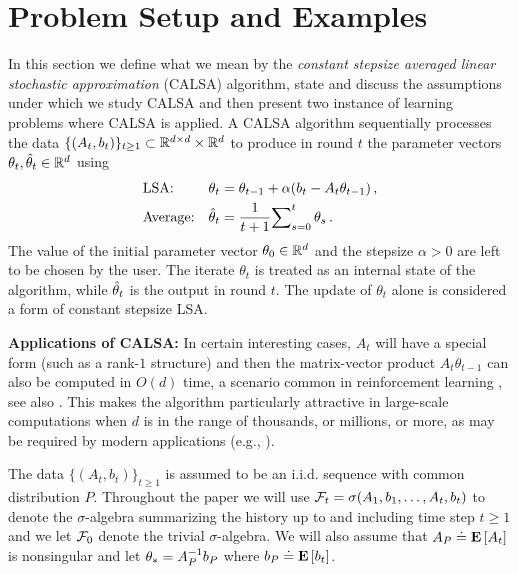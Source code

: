 \section{Problem Setup and Examples}\label{sec:prob}
In this section we define what we mean by the \emph{constant stepsize averaged linear stochastic approximation} (CALSA) algorithm, state and discuss the assumptions under which we study CALSA and then present two instance of learning problems where CALSA is applied. A CALSA algorithm sequentially processes the data $\{(A_t,b_t)\}_{t\ge 1} \subset \mathbb{R}^{d \times d} \times \mathbb{R}^d$ to produce in round $t$ the parameter vectors 
$\theta_t,\hat{\theta}_t\in \mathbb{R}^{d}$  using 
\begin{subequations}\label{eq:lsa}
\begin{align}
\label{conststep}&\text{LSA:} &\theta_t&=\theta_{t-1}+\alpha(b_t-A_t\theta_{t-1})\,,\\
\label{iteravg}&\text{Average:} &\hat{\theta}_t&=\frac{1}{t+1}{\sum}_{s=0}^{t}\,\theta_s\,.
\end{align}
\end{subequations}
The value of the initial parameter vector $\theta_0\in \mathbb{R}^d$ and the stepsize $\alpha>0$ are left to be chosen by the user. 
The iterate $\theta_t$ is treated as an internal state of the algorithm, while $\hat{\theta}_t$ is the output in round $t$. The update of $\theta_t$ alone is considered a form of constant stepsize LSA.

\textbf{Applications of CALSA:} In certain interesting cases, $A_t$ will have a special form (such as a rank-$1$ structure) and then the matrix-vector product $A_t \theta_{t-1}$ can also be computed in $O(d)$ time, a scenario common in reinforcement learning \cite{sutton,konda-tsitsiklis,gtd,gtd2,gtdmp}, see also . This makes the algorithm particularly attractive in large-scale computations when $d$ is in the range of thousands, or millions, or more, as may be required by modern applications (e.g., \citep{LiMaTaBo16}). 
\fi

The data $\{(A_t,b_t)\}_{t\ge 1}$ is assumed to be an i.i.d. sequence with common distribution $P$. 
Throughout the paper we will use
$\mathcal{F}_t = \sigma(A_1,b_1,\dots,A_t,b_t)$ to denote the $\sigma$-algebra summarizing the history up to and
including time step $t\ge 1$ and we let $\mathcal{F}_0$ denote the trivial $\sigma$-algebra. We will also assume
that $A_P \doteq \mathbf{E}\left[A_t\right]$ is nonsingular and let $\theta_* = A_P^{-1} b_P$ where $b_P \doteq \mathbf{E}\left[b_t\right]$.

